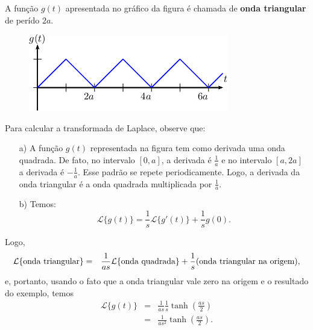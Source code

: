 \documentclass[a4paper,10pt]{book}
\begin{document}
 
A função $g(t)$ apresentada no gráfico da figura  é chamada de {\bf onda triangular} de perído $2a$.
\begin{figure}[!ht]
 \begin{center}
 
 \includegraphics{figs/especiais_figura_2}\end{center}
 \caption{\label{fig_onda_triangular}}
 \end{figure}
 Para calcular a transformada de Laplace, observe que:
 \begin{itemize}
  \item[a)] A função $g(t)$ representada na figura  tem como derivada uma onda quadrada. De fato, no intervalo $[0,a]$, a derivada é $\frac{1}{a}$ e no intervalo $[a,2a]$ a derivada é $-\frac{1}{a}$. Esse padrão se repete periodicamente. Logo, a derivada da onda triangular é a onda quadrada multiplicada por $\frac{1}{a}$.
  \item[b)] Temos:
  \begin{equation}
  \mathcal{L}\{g(t)\}=\frac{1}{s}\mathcal{L}\{g'(t)\}+\frac{1}{s}g(0).
  \end{equation}
 \end{itemize}
 Logo,
 \begin{eqnarray*}
 \mathcal{L}\{\hbox{onda triangular}\}&=&\frac{1}{as}\mathcal{L}\{\hbox{onda quadrada}\}+\frac{1}{s}\hbox{(onda triangular na origem)},
 \end{eqnarray*}
 e, portanto, usando o fato que a onda triangular vale zero na origem e o resultado do exemplo, temos
 \begin{eqnarray*}
 \mathcal{L}\{g(t)\}&=&\frac{1}{as}\frac{1}{s} \tanh\left(\frac{as}{2}\right)\\
 &=&\frac{1}{as^2} \tanh\left(\frac{as}{2}\right).
 \end{eqnarray*}
\end{document}
